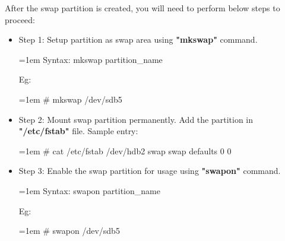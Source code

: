 \setlength{\columnsep}{3pt}
\begin{flushleft}
	
After the swap partition is created, you will need to perform below steps to proceed:
\begin{itemize}
	\item Step 1: Setup partition as swap area using \textbf{"mkswap"} command.
	\begin{tcolorbox}[breakable,notitle,boxrule=-0pt,colback=pink,colframe=pink]
		\color{black}
		\font=1em
		Syntax: mkswap partition\_name
		\font=4pt
	\end{tcolorbox}
	
	Eg:
	\begin{tcolorbox}[breakable,notitle,boxrule=-0pt,colback=black,colframe=black]
		\color{green}
		\font=1em
		\# mkswap /dev/sdb5
		\font=4pt
	\end{tcolorbox}

	\bigskip
	\bigskip
	
	\item Step 2: Mount swap partition permanently. Add the partition in \textbf{"/etc/fstab"} file.
	\newline
	Sample entry:
	\bigskip
	\begin{tcolorbox}[breakable,notitle,boxrule=-0pt,colback=black,colframe=black]
		\color{green}
		\font=1em
		\# cat /etc/fstab
		\newline
		\color{white}
		/dev/hdb2 swap swap defaults 0 0
		\font=4pt
	\end{tcolorbox}
		
	\bigskip
	\bigskip
		
	\item Step 3: Enable the swap partition for usage using \textbf{"swapon"} command.
	\begin{tcolorbox}[breakable,notitle,boxrule=-0pt,colback=pink,colframe=pink]
		\color{black}
		\font=1em
		Syntax: swapon partition\_name
		\font=4pt
	\end{tcolorbox}
	
	Eg:
	\begin{tcolorbox}[breakable,notitle,boxrule=-0pt,colback=black,colframe=black]
		\color{green}
		\font=1em
		\# swapon /dev/sdb5
		\font=4pt
	\end{tcolorbox}
	

\end{itemize}
\end{flushleft}
